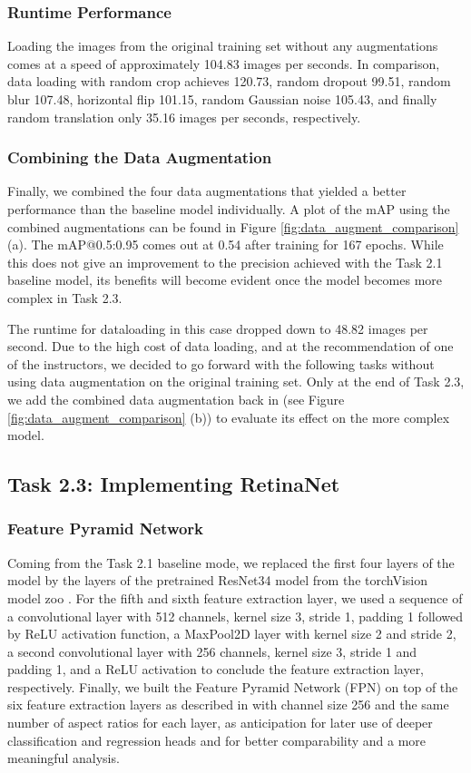 \documentclass{article}
\begin{document}
\subsubsection*{Runtime Performance}
Loading the images from the original training set without any augmentations comes at a speed of approximately 104.83 images per seconds. In comparison, data loading with random crop achieves 120.73, random dropout 99.51, random blur 107.48, horizontal flip 101.15, random Gaussian noise 105.43, and finally random translation only 35.16 images per seconds, respectively.

\subsubsection*{Combining the Data Augmentation}
Finally, we combined the four data augmentations that yielded a better performance than the baseline model individually. A plot of the mAP using the combined augmentations can be found in Figure \ref{fig:data_augment_comparison} (a). The mAP@0.5:0.95 comes out at 0.54 after training for 167 epochs. While this does not give an improvement to the precision achieved with the Task 2.1 baseline model, its benefits will become evident once the model becomes more complex in Task 2.3.

The runtime for dataloading in this case dropped down to 48.82 images per second. Due to the high cost of data loading, and at the recommendation of one of the instructors, we decided to go forward with the following tasks without using data augmentation on the original training set. Only at the end of Task 2.3, we add the combined data augmentation back in (see Figure \ref{fig:data_augment_comparison} (b)) to evaluate its effect on the more complex model. 

\subsection*{Task 2.3: Implementing RetinaNet}

\subsubsection*{Feature Pyramid Network}
Coming from the Task 2.1 baseline mode, we replaced the first four layers of the model by the layers of the pretrained ResNet34 model from the torchVision model zoo \cite{pytorchModelZoo}. For the fifth and sixth feature extraction layer, we used a sequence of a convolutional layer with 512 channels, kernel size 3, stride 1, padding 1 followed by ReLU activation function, a MaxPool2D layer with kernel size 2 and stride 2, a second convolutional layer with 256 channels, kernel size 3, stride 1 and padding 1, and a ReLU activation to conclude the feature extraction layer, respectively. Finally, we built the Feature Pyramid Network (FPN) on top of the six feature extraction layers as described in \cite{lin2017feature} with channel size 256 and the same number of aspect ratios for each layer, as anticipation for later use of deeper classification and regression heads and for better comparability and a more meaningful analysis.
\end{document}
